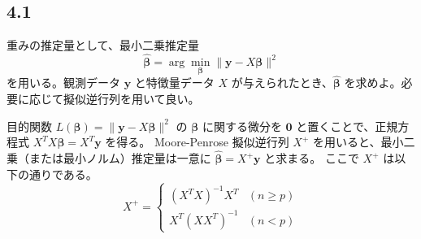 \documentclass[11pt,a4paper,dvipdfmx]{article}
\numberwithin{equation}{section}
\newenvironment{note}[0]
{
    \begin{tcolorbox}[sharp corners, colframe=gray!20, colback=gray!20, width=\textwidth]
}
{
    \end{tcolorbox}
}
\begin{document}
\subsection*{4.1}
\begin{note}
重みの推定量として、最小二乗推定量
\begin{equation*}
\hat{\bm{\beta}} = \arg\min_{\bm{\beta}} \|\bm{y} - X\bm{\beta}\|^2
\end{equation*}
を用いる。観測データ $\bm{y}$ と特徴量データ $X$ が与えられたとき、$\hat{\bm{\beta}}$ を求めよ。必要に応じて擬似逆行列を用いて良い。
\end{note}
\begin{proofbox}
目的関数 $L(\bm{\beta}) = \|\bm{y} - X\bm{\beta}\|^2$ の $\bm{\beta}$ に関する微分を $\bm{0}$ と置くことで、正規方程式 $X^T X \bm{\beta} = X^T \bm{y}$ を得る。
Moore-Penrose 擬似逆行列 $X^+$ を用いると、最小二乗（または最小ノルム）推定量は一意に $\hat{\bm{\beta}} = X^+ \bm{y}$ と求まる。
ここで $X^+$ は以下の通りである。
\begin{equation}
X^+ = \begin{cases} (X^T X)^{-1} X^T & (n \ge p) \\ X^T (X X^T)^{-1} & (n < p) \end{cases}
\end{equation}
\end{proofbox}
\end{document}
